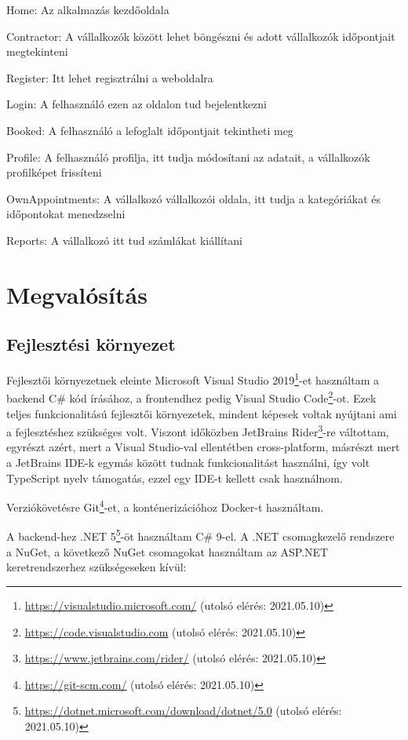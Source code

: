 \begin{compactitem}
	\item Home: Az alkalmazás kezdőoldala
	\item Contractor: A vállalkozók között lehet böngészni és adott vállalkozók időpontjait megtekinteni
	\item Register: Itt lehet regisztrálni a weboldalra
	\item Login: A felhasználó ezen az oldalon tud bejelentkezni
	\item Booked: A felhasználó a lefoglalt időpontjait tekintheti meg
	\item Profile: A felhasználó profilja, itt tudja módosítani az adatait, a vállalkozók profilképet frissíteni
	\item OwnAppointments: A vállalkozó vállalkozói oldala, itt tudja a kategóriákat és időpontokat menedzselni
	\item Reports: A vállalkozó itt tud számlákat kiállítani
\end{compactitem}

\clearpage

\section{Megvalósítás}
\subsection{Fejlesztési környezet}

Fejlesztői környezetnek eleinte Microsoft Visual Studio 2019\footnote{\url{https://visualstudio.microsoft.com/} (utolsó elérés: 2021.05.10)}-et használtam a backend C\# kód írásához, a frontendhez pedig Visual Studio Code\footnote{\url{https://code.visualstudio.com} (utolsó elérés: 2021.05.10)}-ot. Ezek teljes funkcionalitású fejlesztői környezetek, mindent képesek voltak nyújtani ami a fejlesztéshez szükséges volt. Viszont időközben JetBrains Rider\footnote{\url{https://www.jetbrains.com/rider/} (utolsó elérés: 2021.05.10)}-re váltottam, egyrészt azért, mert a Visual Studio-val ellentétben cross-platform, másrészt mert a JetBrains IDE-k egymás között tudnak funkcionalitást használni, így volt TypeScript nyelv támogatás, ezzel egy IDE-t kellett csak használnom.

Verziókövetésre Git\footnote{\url{https://git-scm.com/} (utolsó elérés: 2021.05.10)}-et, a konténerizációhoz Docker-t használtam.

A backend-hez .NET 5\footnote{\url{https://dotnet.microsoft.com/download/dotnet/5.0} (utolsó elérés: 2021.05.10)}-öt használtam C\# 9-el. A .NET csomagkezelő rendszere a NuGet, a következő NuGet csomagokat használtam az ASP.NET keretrendszerhez szükségeseken kívül:

